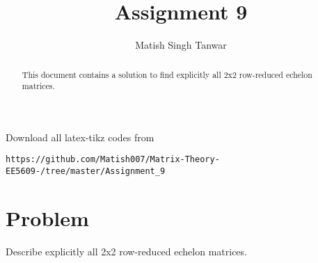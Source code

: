 \documentclass[journal,12pt,twocolumn]{IEEEtran}
\begin{document}
 \vspace{3cm}
 \title{Assignment 9}
 \author{Matish Singh Tanwar}
 \maketitle
 \newpage
 \bigskip
 \renewcommand{\thetable}{\theenumi}
\vspace{1.0cm}
\begin{abstract}
This document contains a solution to find explicitly all 2x2 row-reduced echelon matrices.
\end{abstract}
\vspace{0.5cm}
%
Download all latex-tikz codes from 
\begin{lstlisting}
https://github.com/Matish007/Matrix-Theory-EE5609-/tree/master/Assignment_9
\end{lstlisting}
%
%
\vspace{0.5mm}
\section{Problem}
Describe explicitly all 2x2 row-reduced echelon matrices.
\end{document}
